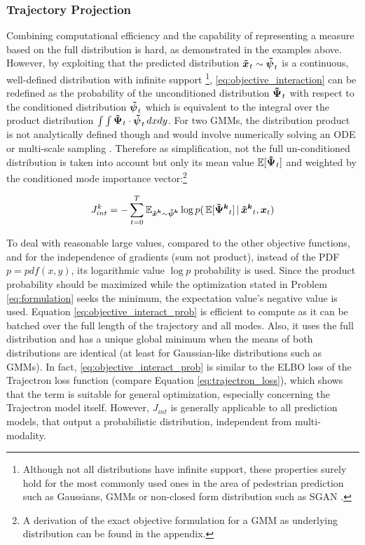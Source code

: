 \subsubsection{Trajectory Projection}
Combining computational efficiency and the capability of representing a measure based on the full distribution is hard, as demonstrated in the examples above. However, by exploiting that the predicted distribution $\xped[]_t \sim \dist[]_t$ is a continuous, well-defined distribution with infinite support \footnote{Although not all distributions have infinite support, these properties surely hold for the most commonly used ones in the area of pedestrian prediction such as Gaussians, \ac{GMM}s \cite{Salzmann2020} or non-closed form distribution such as SGAN \cite{Gupta2018}.}, \ref{eq:objective_interaction} can be redefined as the probability of the unconditioned distribution $\distwo[]_t$ with respect to the conditioned distribution $\dist[]_t$ which is equivalent to the integral over the product distribution $\int \int \distwo[]_t \cdot \dist[]_t \, dxdy$.
\newline
For two \ac{GMM}s, the distribution product is not analytically defined though and would involve numerically solving an \ac{ODE} \cite{Schrempf2005} or multi-scale sampling \cite{Ihler2003}. Therefore as simplification, not the full un-conditioned distribution is taken into account but only its mean value $\mathbb{E}[\distwo[]_t]$ and weighted by the conditioned mode importance vector:\footnote{A derivation of the exact objective formulation for a \ac{GMM} as underlying distribution can be found in the appendix.}

\begin{equation}
J_{int}^k = - \sum_{t=0}^T \mathbb{E}_{\xped[k] \sim \dist[k]} \log p(\, \mathbb{E}[\distwo[k]_t] \, | \, \xped[k]_t, \x_t)
\label{eq:objective_interact_prob}
\end{equation}

To deal with reasonable large values, compared to the other objective functions, and for the independence of gradients (sum not product), instead of the \ac{PDF} $p = pdf(x, y)$, its logarithmic value $\log p$ probability is used. Since the product probability should be maximized while the optimization stated in Problem \ref{eq:formulation} seeks the minimum, the expectation value's negative value is used.
\newline
Equation \ref{eq:objective_interact_prob} is efficient to compute as it can be batched over the full length of the trajectory and all modes. Also, it uses the full distribution and has a unique global minimum when the means of both distributions are identical (at least for Gaussian-like distributions such as \ac{GMM}s). In fact, \ref{eq:objective_interact_prob} is similar to the \ac{ELBO} loss of the Trajectron loss function (compare Equation \ref{eq:trajectron_loss}), which shows that the term is suitable for general optimization, especially concerning the Trajectron model itself. However, $J_{int}$ is generally applicable to all prediction models, that output a probabilistic distribution, independent from multi-modality.
